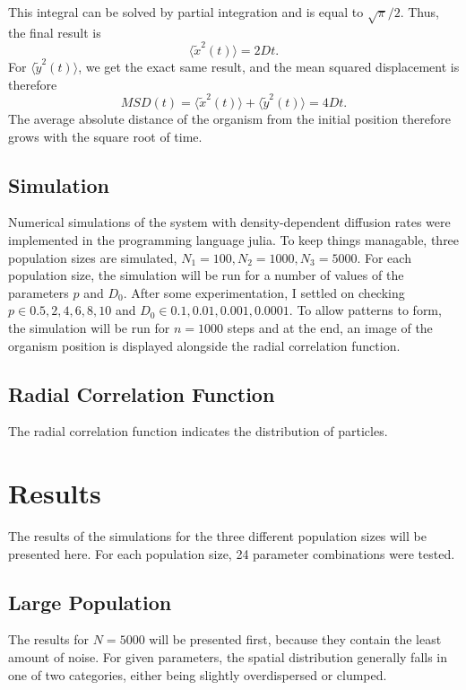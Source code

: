 \documentclass{article}
\begin{document}
This integral can be solved by partial integration and is equal to $\sqrt{\pi}/2$.
Thus, the final result is 
\begin{equation*}
    \langle \tilde{x}^2(t)\rangle = 2Dt.
\end{equation*}
For $\langle \tilde{y}^2(t)\rangle$, we get the exact same result, and the mean squared displacement is therefore
\begin{equation*}
    MSD(t) = \langle \tilde{x}^2(t)\rangle + \langle \tilde{y}^2(t)\rangle  = 4Dt.
\end{equation*}
The average absolute distance of the organism from the initial position therefore grows with the square root of time.

\subsection{Simulation}
Numerical simulations of the system with density-dependent diffusion rates were implemented in the programming language julia.
To keep things managable, three population sizes are simulated, $N_1=100, N_2 = 1000, N_3 = 5000$.
For each population size, the simulation will be run for a number of values of the parameters $p$ and $D_0$.
After some experimentation, I settled on checking $p \in {0.5, 2, 4, 6, 8, 10}$ and $D_0 \in {0.1, 0.01, 0.001, 0.0001}$. 
To allow patterns to form, the simulation will be run for $n=1000$ steps and at the end, an image of the organism position is displayed alongside the radial correlation function.


\subsection{Radial Correlation Function}
The radial correlation function indicates the distribution of particles. 


\section{Results}
The results of the simulations for the three different population sizes will be presented here.
For each population size, 24 parameter combinations were tested.

\subsection{Large Population}
The results for $N=5000$ will be presented first, because they contain the least amount of noise.
For given parameters, the spatial distribution generally falls in one of two categories, either being slightly overdispersed or clumped. 
\end{document}
